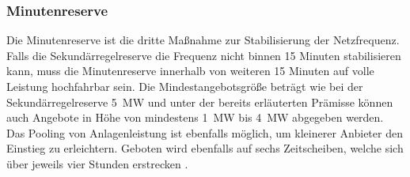 	
		\subsubsection{Minutenreserve}
		
			Die Minutenreserve ist die dritte Maßnahme zur Stabilisierung der Netzfrequenz. 
			Falls die Sekundärregelreserve die Frequenz nicht binnen \num{15} Minuten stabilisieren kann, muss die Minutenreserve innerhalb von weiteren \num{15} Minuten auf volle Leistung hochfahrbar sein.
			Die Mindestangebotsgröße beträgt wie bei der Sekundärregelreserve \SI{5}{\mega\watt} und unter der bereits erläuterten Prämisse können auch Angebote in Höhe von mindestens \SI{1}{\mega\watt} bis \SI{4}{\mega\watt} abgegeben werden.
			Das Pooling von Anlagenleistung ist ebenfalls möglich, um kleinerer Anbieter den Einstieg zu erleichtern.
			Geboten wird ebenfalls auf sechs Zeitscheiben, welche sich über jeweils vier Stunden erstrecken \cite[S. 81 ff.]{Doktorarbeit_Reitsam}. \\
			

